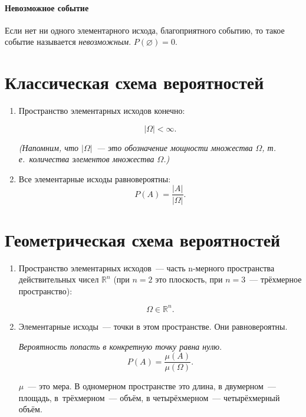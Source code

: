 \documentclass[11pt]{article}
\begin{document}
\paragraph{Невозможное событие} Если нет ни одного элементарного исхода, благоприятного событию, то такое событие называется \emph{невозможным}. $P(\varnothing)=0$.

\section{Классическая схема вероятностей}
\begin{enumerate}
	\item Пространство элементарных исходов конечно:
	
	$$
	|\Omega|<\infty.
	$$
	
	\emph{(Напомним, что $|\Omega|$~--- это обозначение мощности множества $\Omega$, т.\,е.~количества элементов множества $\Omega$.)}
	
	\item Все элементарные исходы равновероятны:
	$$
	P(A)=\frac{|A|}{|\Omega|}.
	$$
	
\end{enumerate}

\section{Геометрическая схема вероятностей}
\begin{enumerate}
	\item Пространство элементарных исходов~--- часть n-мерного пространства действительных чисел $\mathbb{R}^n$ (при $n=2$ это плоскость, при $n=3$~--- трёхмерное пространство):
	
	$$
	\Omega\in\mathbb{R}^n.
	$$
	
	\item Элементарные исходы~--- точки в этом пространстве. Они равновероятны.
	
	\emph{Вероятность попасть в конкретную точку равна нулю}.
	$$
	P(A)=\frac{\mu(A)}{\mu(\Omega)}.
	$$
	
	$\mu$~--- это мера. В одномерном пространстве это длина, в двумерном~--- площадь, в~трёхмерном~--- объём, в четырёхмерном~--- четырёхмерный объём.
	
\end{enumerate}

\newpage
\end{document}

